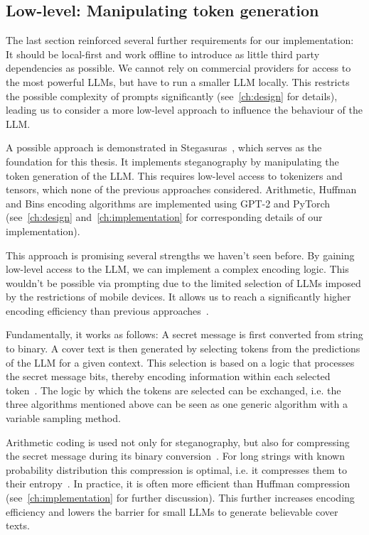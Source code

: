 \subsection{Low-level: Manipulating token generation}
\label{sec:lowLevelManipulatingTokenGeneration}
The last section reinforced several further requirements for our implementation: It should be local-first and work offline to introduce as little third party dependencies as possible. We cannot rely on commercial providers for access to the most powerful \glspl{LLM}, but have to run a smaller \gls{LLM} locally. This restricts the possible complexity of prompts significantly (see~\cref{ch:design} for details), leading us to consider a more low-level approach to influence the behaviour of the \gls{LLM}.

A possible approach is demonstrated in Stegasuras~\cite{zieglerNeuralLinguisticSteganography2019,zieglerHarvardnlpNeuralSteganography2025,zieglerStegasuras2025}, which serves as the foundation for this thesis. It implements steganography by manipulating the token generation of the \gls{LLM}. This requires low-level access to tokenizers and tensors, which none of the previous approaches considered. Arithmetic, Huffman and Bins encoding algorithms are implemented using GPT-2 and PyTorch (see~\cref{ch:design} and~\cref{ch:implementation} for corresponding details of our implementation).

This approach is promising several strengths we haven't seen before. By gaining low-level access to the \gls{LLM}, we can implement a complex encoding logic. This wouldn't be possible via prompting due to the limited selection of \glspl{LLM} imposed by the restrictions of mobile devices. It allows us to reach a significantly higher encoding efficiency than previous approaches~\cite{zieglerNeuralLinguisticSteganography2019}.

Fundamentally, it works as follows: A secret message is first converted from string to binary. A cover text is then generated by selecting tokens from the predictions of the \gls{LLM} for a given context. This selection is based on a logic that processes the secret message bits, thereby encoding information within each selected token~\cite{zieglerNeuralLinguisticSteganography2019}. The logic by which the tokens are selected can be exchanged, i.e. the three algorithms mentioned above can be seen as one generic algorithm with a variable sampling method.

Arithmetic coding is used not only for steganography, but also for compressing the secret message during its binary conversion~\cite{zieglerNeuralLinguisticSteganography2019}. For long strings with known probability distribution this compression is optimal, i.e. it compresses them to their entropy~\cite{rissanenArithmeticCoding1979}. In practice, it is often more efficient than Huffman compression~\cite{zieglerNeuralLinguisticSteganography2019} (see~\cref{ch:implementation} for further discussion). This further increases encoding efficiency and lowers the barrier for small \glspl{LLM} to generate believable cover texts.

